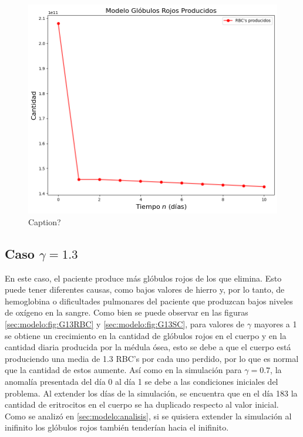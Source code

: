 \begin{figure}[h]
    \centering
    \includegraphics[scale=0.6]{figures/BaseG07SC.png}
    \caption{Caption?}
    \label{sec:modelo:fig:G07SC}
\end{figure}

\FloatBarrier

\subsection{Caso $\gamma=1.3$}\label{subsec:modelo:simulaciones:G13}

En este caso, el paciente produce más glóbulos rojos de los que elimina. Esto puede tener diferentes causas, como bajos valores de hierro y, por lo tanto, de hemoglobina o dificultades pulmonares del paciente que produzcan bajos niveles de oxígeno en la sangre. Como bien se puede observar en las figuras \ref{sec:modelo:fig:G13RBC} y \ref{sec:modelo:fig:G13SC}, para valores de $\gamma$ mayores a 1 se obtiene un crecimiento en la cantidad de glóbulos rojos en el cuerpo y en la cantidad diaria producida por la médula ósea, esto se debe a que el cuerpo está produciendo una media de 1.3 RBC's por cada uno perdido, por lo que es normal que la cantidad de estos aumente. Así como en la simulación para $\gamma = 0.7$, la anomalía presentada del día 0 al día 1 se debe a las condiciones iniciales del problema. Al extender los días de la simulación, se encuentra que en el día 183 la cantidad de eritrocitos en el cuerpo se ha duplicado respecto al valor inicial. Como se analizó en \ref{sec:modelo:analisis}, si se quisiera extender la simulación al inifinito los glóbulos rojos también tenderían hacia el inifinito. 

